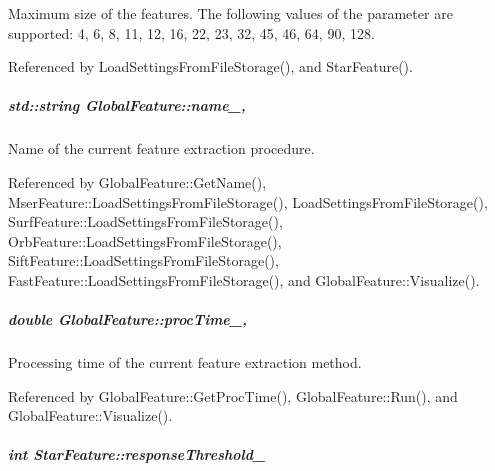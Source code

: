 Maximum size of the features. The following values of the parameter are supported\-: 4, 6, 8, 11, 12, 16, 22, 23, 32, 45, 46, 64, 90, 128. 



Referenced by Load\-Settings\-From\-File\-Storage(), and Star\-Feature().

\hypertarget{group___feature_extractor_abee52be830de272bd27685083bf28aae}{
\subparagraph[{name\-\_\-}]{\setlength{\rightskip}{0pt plus 5cm}std\-::string Global\-Feature\-::name\-\_\-\hspace{0.3cm}{\ttfamily [protected]}, {\ttfamily [inherited]}}}\label{group___feature_extractor_abee52be830de272bd27685083bf28aae}


Name of the current feature extraction procedure. 



Referenced by Global\-Feature\-::\-Get\-Name(), Mser\-Feature\-::\-Load\-Settings\-From\-File\-Storage(), Load\-Settings\-From\-File\-Storage(), Surf\-Feature\-::\-Load\-Settings\-From\-File\-Storage(), Orb\-Feature\-::\-Load\-Settings\-From\-File\-Storage(), Sift\-Feature\-::\-Load\-Settings\-From\-File\-Storage(), Fast\-Feature\-::\-Load\-Settings\-From\-File\-Storage(), and Global\-Feature\-::\-Visualize().

\hypertarget{group___feature_extractor_aa3306975b929f5503dac51829f9e04a0}{
\subparagraph[{proc\-Time\-\_\-}]{\setlength{\rightskip}{0pt plus 5cm}double Global\-Feature\-::proc\-Time\-\_\-\hspace{0.3cm}{\ttfamily [protected]}, {\ttfamily [inherited]}}}\label{group___feature_extractor_aa3306975b929f5503dac51829f9e04a0}


Processing time of the current feature extraction method. 



Referenced by Global\-Feature\-::\-Get\-Proc\-Time(), Global\-Feature\-::\-Run(), and Global\-Feature\-::\-Visualize().

\hypertarget{group___feature_extractor_a85a6ef809bb695a64de0bb5d4121e28a}{
\subparagraph[{response\-Threshold\-\_\-}]{\setlength{\rightskip}{0pt plus 5cm}int Star\-Feature\-::response\-Threshold\-\_\-\hspace{0.3cm}{\ttfamily [private]}}}\label{group___feature_extractor_a85a6ef809bb695a64de0bb5d4121e28a}


